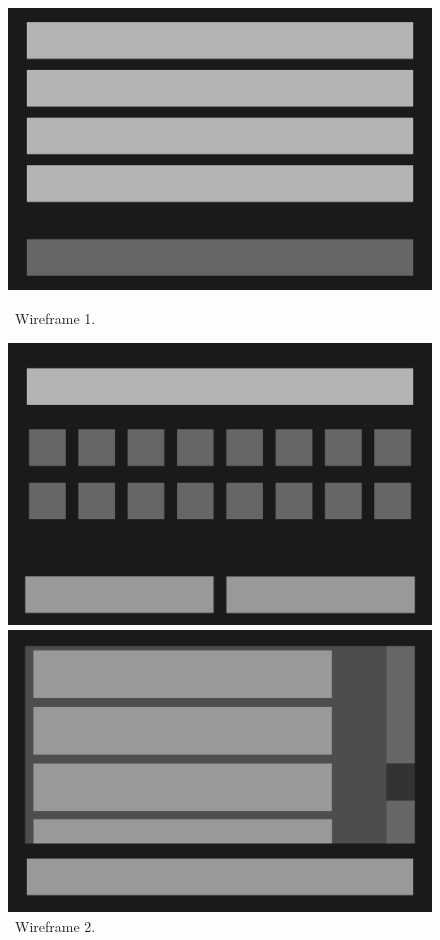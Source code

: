 \begin{figure}[h]
    \centering
    \begin{minipage}[b]{0.315\textwidth}
        \centering
        \includegraphics[width=\textwidth]{text/design/wireframe1.pdf}
        \caption{~Wireframe 1.}
        \label{fig:wireframe1}
    \end{minipage}
    \hfill
    \begin{minipage}[b]{0.315\textwidth}
        \centering
        \includegraphics[width=\textwidth]{text/design/wireframe2.pdf}
        \caption{~Wireframe 2.}
        \label{fig:wireframe2}
    \end{minipage}
    \hfill
    \begin{minipage}[b]{0.315\textwidth}
        \centering
        \includegraphics[width=\textwidth]{text/design/wireframe3.pdf}

\end{minipage}
\end{figure}

